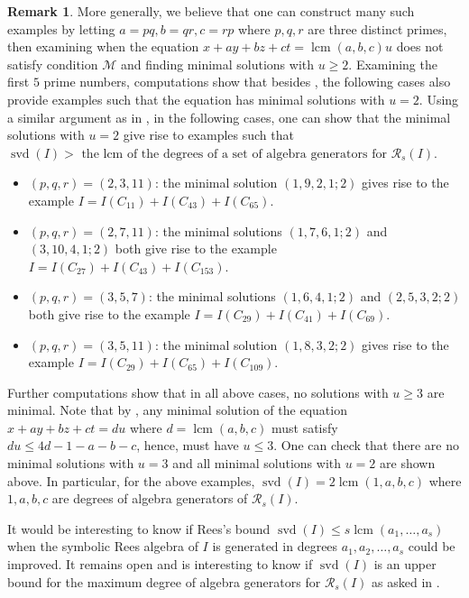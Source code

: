 \documentclass[12pt]{amsart}
\numberwithin{equation}{section}
\theoremstyle{definition}
\newtheorem{remark}[theorem]{Remark}
\DeclareMathOperator{\lcm}{lcm}
\DeclareMathOperator{\svd}{svd}
\def\M{{\mathcal M}}
\def\R{{\mathcal R}}
\def\R{{\mathcal R}}
\begin{document}
\begin{remark}
    \label{rem.3DisjOddCycles}
    More generally, we believe that one can construct many such examples by letting $a=pq, b=qr, c=rp$ where $p,q,r$ are three distinct primes, then examining when the equation $x+ay+bz+ct=\lcm(a,b,c)u$ does not satisfy condition $\M$ and finding minimal solutions with $u \ge 2$. 
    Examining the first $5$ prime numbers, computations show that besides , the following cases also provide examples such that the equation has minimal solutions with $u=2$. 
    Using a similar argument as in , in the following cases, one can show that the minimal solutions with $u=2$ give rise to examples such that 
    $\svd(I) > \text{ the lcm of the degrees of a set of algebra generators for } \R_s(I)$.
    \begin{itemize}
        \item $(p,q,r)=(2,3,11)$: the minimal solution $(1,9,2,1;2)$ gives rise to the example $I=I(C_{11})+I(C_{43})+I(C_{65})$. 
        \item $(p,q,r)=(2,7,11)$: the minimal solutions $(1,7,6,1;2)$ and $(3,10,4,1;2)$ both give rise to the example $I=I(C_{27})+I(C_{43})+I(C_{153})$. 
        \item $(p,q,r)=(3,5,7)$: the minimal solutions $(1,6,4,1;2)$ and $(2,5,3,2;2)$ both give rise to the example $I=I(C_{29})+I(C_{41})+I(C_{69})$. 
        \item $(p,q,r)=(3,5,11)$: the minimal solution $(1,8,3,2;2)$ gives rise to the example $I=I(C_{29})+I(C_{65})+I(C_{109})$. 
    \end{itemize}
    Further computations show that in all above cases, no solutions with $u\ge 3$ are minimal. Note that by , any minimal solution of the equation $x+ay+bz+ct=du$ where $d=\lcm(a,b,c)$ must satisfy $du \le 4d-1-a-b-c$, hence, must have $u \le 3$. One can check that there are no minimal solutions with $u=3$ and all minimal solutions with $u=2$ are shown above. In particular, for the above examples, $\svd(I)=2\lcm(1,a,b,c)$ where $1,a,b,c$ are degrees of algebra generators of $\R_s(I)$.
\end{remark}

It would be interesting to know if Rees's bound $\svd(I)\le s\lcm(a_1,\ldots ,a_s)$ when the symbolic Rees algebra of $I$ is generated in degrees $a_1,a_2,\ldots,a_s$ could be improved. It remains open and is interesting to know if $\svd(I)$ is an upper bound for the maximum degree of algebra generators for $\R_s(I)$ as asked in \cite[Question 3.11]{symbolicReesSurvey}.


 
\end{document}
